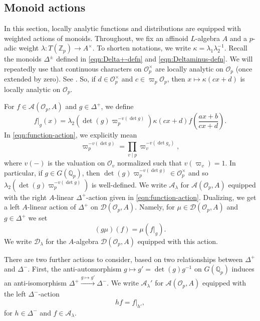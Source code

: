 \documentclass[10pt, twoside]{amsart}
\theoremstyle{plain}
\theoremstyle{definition}
\theoremstyle{remark}
\numberwithin{equation}{subsection}
\def\Q{\mathbb Q}
\def\Z{\mathbb Z}
\def\scro{\mathscr O}
\def\scra{\mathscr A}
\def\scrd{\mathscr D}
\def\scro{\mathscr O}
\begin{document}
\subsection{Monoid actions}\label{subsec:actions}
In this section, locally analytic functions and distributions are equipped with weighted actions of monoids. Throughout, we fix an affinoid $L$-algebra $A$ and a $p$-adic weight $\lambda : T(\Z_p)\rightarrow A^\times$. To shorten notations, we write $\kappa = \lambda_1\lambda_2^{-1}$. Recall the monoids $\Delta^{\pm}$ defined in \eqref{eqn:Delta+-defn} and \eqref{eqn:Deltaminus-defn}. We will repeatedly use that continuous characters on $\scro_p^\times$ are locally analytic on $\scro_p$ (once extended by zero). See \cite[Lemma 3.4.6]{Urban}. So, if $d \in \scro_p^\times$ and $c \in \varpi_p \scro_p$, then $x \mapsto \kappa(cx+d)$ is locally analytic on $\scro_p$.
 
For $f \in \scra(\scro_p,A)$ and $g \in \Delta^+$, we  define
\begin{equation}\label{eqn:function-action}
f|_g(x) = \lambda_2(\det (g)\varpi_p^{-v(\det g)})\kappa(cx+d)f\left(\frac{ax+b}{cx+d}\right).
\end{equation}
In \eqref{eqn:function-action}, we explicitly mean
$$
\varpi_p^{-v(\det g)} = \prod_{v \mid p} \varpi_v^{-v(\det g_v)},
$$
where $v(-)$ is the valuation on $\scro_v$ normalized such that $v(\varpi_v) = 1$. In particular, if $g \in G(\Q_p)$, then $\det(g)\varpi_p^{-v(\det g)} \in \scro_p^\times$ and so $\lambda_2(\det(g)\varpi_p^{-v(\det g)})$ is well-defined. We write $\scra_\lambda$ for $\scra(\scro_p,A)$ equipped with the right $A$-linear $\Delta^+$-action given in \eqref{eqn:function-action}. Dualizing, we get a left $A$-linear action of $\Delta^+$ on $\scrd(\scro_p,A)$. Namely, for $\mu \in \scrd(\scro_p,A)$ and $g \in \Delta^+$ we set
$$
(g\mu)(f) = \mu(f|_g).
$$ 
We write $\scrd_\lambda$ for the $A$-algebra $\scrd(\scro_p,A)$ equipped with this action.

There are two further actions to consider, based on two relationships between $\Delta^+$ and $\Delta^-$. First, the anti-automorphism $g \mapsto g' = \det(g)g^{-1}$ on $G(\Q_p)$ induces an anti-isomorphism $\Delta^+ \xrightarrow{g \mapsto g'} \Delta^-$. We write $\scra_{\lambda}'$ for $\scra(\scro_p,A)$ equipped with the left $\Delta^-$-action 
$$
hf = f|_{h'},
$$
for $h \in \Delta^-$ and $f \in \scra_{\lambda}$.
\end{document}
